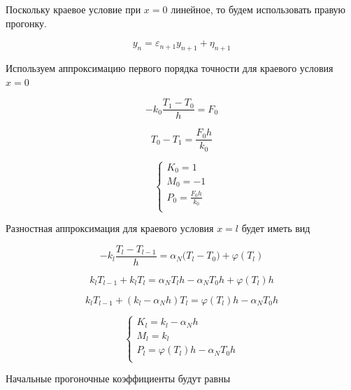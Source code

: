Поскольку краевое условие при $x=0$ линейное, то будем использовать правую прогонку.

\begin{equation*}
    y_n = \varepsilon_{n+1} y_{n+1} + \eta_{n+1}
\end{equation*}

Используем аппроксимацию первого порядка точности для краевого условия $x=0$

\begin{equation*}
    -k_0 \frac{T_1 - T_0}{h} = F_0
\end{equation*}

\begin{equation*}
    T_0 - T_1 = \frac{F_0h}{k_0}
\end{equation*}

\begin{equation*}
    \begin{cases}
        K_0 = 1 \\
        M_0 = -1 \\
        P_0 = \frac{F_0h}{k_0} \\
    \end{cases}
\end{equation*}

Разностная аппроксимация для краевого условия $x=l$ будет иметь вид

\begin{equation*}
    -k_l \frac{T_l - T_{l-1}}{h} = \alpha_N\big(T_l - T_0\big) + \varphi(T_l)
\end{equation*}

\begin{equation*}
    k_lT_{l-1} + k_lT_l = \alpha_N T_l h - \alpha_NT_0 h + \varphi(T_l) h
\end{equation*}

\begin{equation*}
    k_lT_{l-1} + (k_l - \alpha_Nh)T_l = \varphi(T_l)h - \alpha_NT_0h
\end{equation*}

\begin{equation*}
    \begin{cases}
        K_l = k_l - \alpha_Nh \\
        M_l = k_l \\
        P_l = \varphi(T_l)h - \alpha_NT_0h \\
    \end{cases}
\end{equation*}

Начальные прогоночные коэффициенты будут равны

